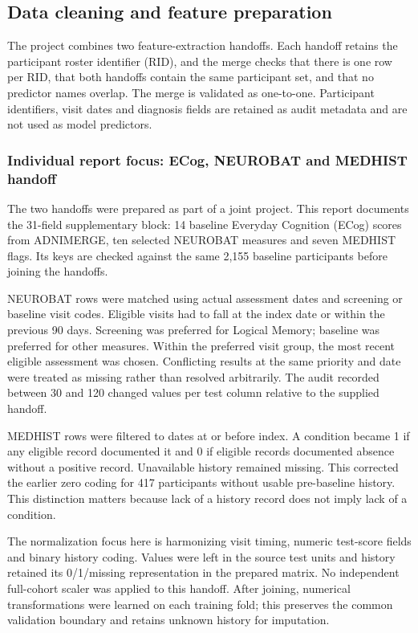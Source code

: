 \documentclass[11pt,a4paper]{article}
\begin{document}
\subsection{Data cleaning and feature preparation}
The project combines two feature-extraction handoffs. Each handoff retains the participant roster identifier (RID), and the merge checks that there is one row per RID, that both handoffs contain the same participant set, and that no predictor names overlap. The merge is validated as one-to-one. Participant identifiers, visit dates and diagnosis fields are retained as audit metadata and are not used as model predictors.

\subsubsection*{Individual report focus: ECog, NEUROBAT and MEDHIST handoff}
The two handoffs were prepared as part of a joint project. This report documents the 31-field supplementary block: 14 baseline Everyday Cognition (ECog) scores from ADNIMERGE, ten selected NEUROBAT measures and seven MEDHIST flags. Its keys are checked against the same 2,155 baseline participants before joining the handoffs.

NEUROBAT rows were matched using actual assessment dates and screening or baseline visit codes. Eligible visits had to fall at the index date or within the previous 90 days. Screening was preferred for Logical Memory; baseline was preferred for other measures. Within the preferred visit group, the most recent eligible assessment was chosen. Conflicting results at the same priority and date were treated as missing rather than resolved arbitrarily. The audit recorded between 30 and 120 changed values per test column relative to the supplied handoff.

MEDHIST rows were filtered to dates at or before index. A condition became 1 if any eligible record documented it and 0 if eligible records documented absence without a positive record. Unavailable history remained missing. This corrected the earlier zero coding for 417 participants without usable pre-baseline history. This distinction matters because lack of a history record does not imply lack of a condition.

The normalization focus here is harmonizing visit timing, numeric test-score fields and binary history coding. Values were left in the source test units and history retained its 0/1/missing representation in the prepared matrix. No independent full-cohort scaler was applied to this handoff. After joining, numerical transformations were learned on each training fold; this preserves the common validation boundary and retains unknown history for imputation.
\end{document}
